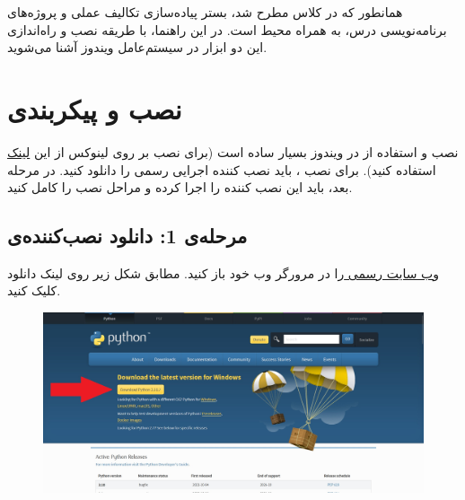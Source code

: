 \documentclass{article}
\begin{document}


\newpage
همانطور که در کلاس مطرح شد، بستر پیاده‌سازی تکالیف عملی و پروژه‌های برنامه‌نویسی درس،  به همراه محیط  است. در این راهنما، با طریقه نصب و راه‌اندازی این دو ابزار در سیستم‌عامل ویندوز آشنا می‌شوید.
\section{نصب و پیکربندی }
نصب و استفاده از  در ویندوز بسیار ساده است (برای نصب  بر روی لینوکس از این \href{https://opensource.com/article/20/4/install-python-linux}{لینک} استفاده کنید). برای نصب ، باید نصب کننده اجرایی رسمی  را دانلود کنید. در مرحله بعد، باید این نصب کننده را اجرا کرده و مراحل نصب را کامل کنید.

\subsection{مرحله‌ی 1: دانلود نصب‌کننده‌ی }
 \href{https://www.python.org/downloads/}{وب سایت رسمی } را در مرورگر وب خود باز کنید. مطابق شکل زیر روی لینک دانلود کلیک کنید.
\begin{figure}[H]
    \centering
    \includegraphics[width=1.0\textwidth]{figures/1.jpg}
    \caption
	{}
    \label{fig:fig1}
\end{figure}
\end{document}
